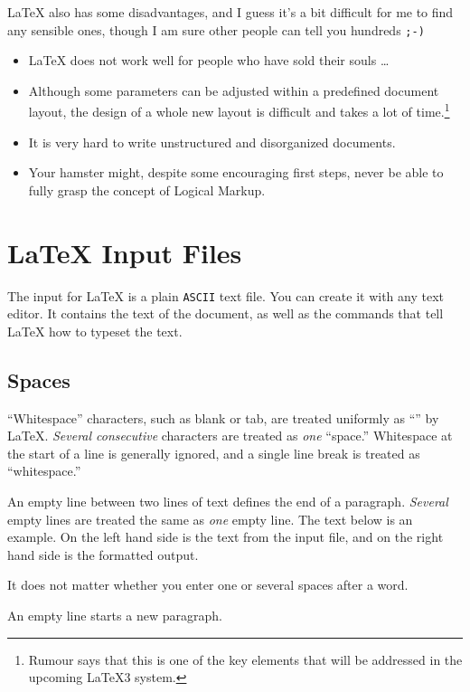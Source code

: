 \medskip

\noindent\LaTeX{} also has some disadvantages, and I guess it's a bit
difficult for me to find any sensible ones, though I am sure other people
can tell you hundreds \texttt{;-)}

\begin{itemize}
\item \LaTeX{} does not work well for people who have sold their
  souls \ldots
\item Although some parameters can be adjusted within a predefined
  document layout, the design of a whole new layout is difficult and
  takes a lot of time.\footnote{Rumour says that this is one of the
    key elements that will be addressed in the upcoming \LaTeX 3
    system.}
\item It is very hard to write unstructured and disorganized documents.
\item Your hamster might, despite some encouraging first steps, never be
able to fully grasp the concept of Logical Markup.
\end{itemize}
 
\section{\LaTeX{} Input Files}

The input for \LaTeX{} is a plain \texttt{ASCII} text file. You can create it
with any text editor. It contains the text of the document, as well as
the commands that tell \LaTeX{} how to typeset the text.

\subsection{Spaces}

``Whitespace'' characters, such as blank or tab, are
treated uniformly as ``'' by \LaTeX{}. \emph{Several
  consecutive}  characters are treated as \emph{one}
``space.''  Whitespace at the start of a line is generally ignored, and
a single line break is treated as ``whitespace.''

An empty line between two lines of text defines the end of a
paragraph. \emph{Several} empty lines are treated the same as
\emph{one} empty line. The text below is an example. On the left hand
side is the text from the input file, and on the right hand side is the
formatted output.

\begin{example}
It does not matter whether you
enter one or several     spaces
after a word.

An empty line starts a new 
paragraph.
\end{example}
 
